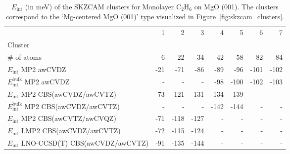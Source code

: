 \begin{table}
\caption{\label{tab:system_eint_mgo_c2h6_monolayer}$E_\textrm{int}$ (in meV) of the SKZCAM clusters for Monolayer C$_2$H$_6$ on MgO (001). The clusters correspond to the `Mg-centered MgO (001)' type visualized in Figure~\ref{fig:skzcam_clusters}.}
\begin{adjustbox}{center,max width=1.4\textwidth}
\begin{tabular}{lrrrrrrr}
\toprule
 & 1 & 2 & 3 & 4 & 5 & 6 & 7 \\ 
Cluster &  &  &  &  &  &  &  \\
\midrule
\# of atoms & 6 & 22 & 34 & 42 & 58 & 82 & 84 \\
$E_\textrm{int}$ MP2 awCVDZ & -21 & -71 & -86 & -89 & -96 & -101 & -102 \\
$E_\textrm{int}^\textrm{bulk}$ MP2 awCVDZ & - & - & - & -98 & -100 & -102 & -103 \\
$E_\textrm{int}$ MP2 CBS(awCVDZ/awCVTZ) & -73 & -121 & -131 & -134 & -139 & - & - \\
$E_\textrm{int}^\textrm{bulk}$ MP2 CBS(awCVDZ/awCVTZ) & - & - & - & -142 & -144 & - & - \\
$E_\textrm{int}$ MP2 CBS(awCVTZ/awCVQZ) & -71 & -118 & -127 & - & - & - & - \\
$E_\textrm{int}$ LMP2 CBS(awCVDZ/awCVTZ) & -72 & -115 & -124 & - & - & - & - \\
$E_\textrm{int}$ LNO-CCSD(T) CBS(awCVDZ/awCVTZ) & -91 & -135 & -144 & - & - & - & - \\
\bottomrule
\end{tabular}
\end{adjustbox}
\end{table}

